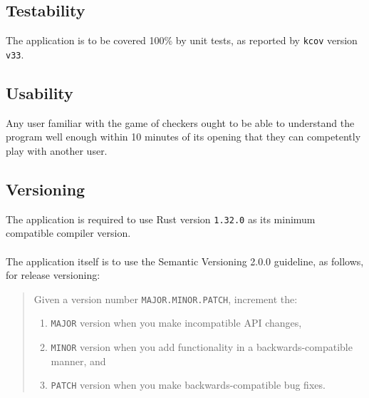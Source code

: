 \subsection{Testability}
The application is to be covered 100\% by unit tests, as reported by
\texttt{kcov}\cite{kcov} version \texttt{v33}.

\subsection{Usability}
Any user familiar with the game of checkers ought to be able to understand the
program well enough within 10 minutes of its opening that they can competently
play with another user.

\subsection{Versioning}
The application is required to use Rust version
\texttt{1.32.0}\cite{rust1.32.0} as its minimum compatible compiler version.
\\\\
\noindent The application itself is to use the Semantic Versioning 2.0.0\cite{semver} guideline, as
follows, for release versioning:
\begin{quote}
Given a version number \texttt{MAJOR.MINOR.PATCH}, increment the:
  \begin{enumerate}
    \item \texttt{MAJOR} version when you make incompatible API changes,
    \item \texttt{MINOR} version when you add functionality in a backwards-compatible manner, and
    \item \texttt{PATCH} version when you make backwards-compatible bug fixes.
  \end{enumerate}
\end{quote}
